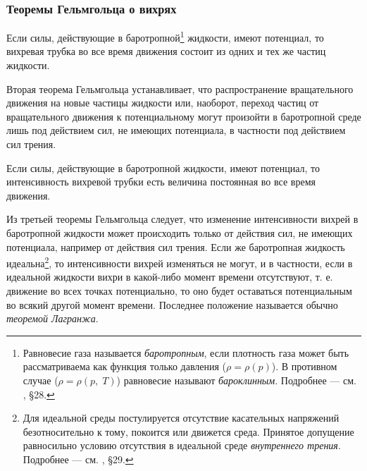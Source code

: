 	\subsubsection{Теоремы Гельмгольца о вихрях}
	\begin{theorem}\label{thm:Gelmgolts-2}
		Если силы, действующие в баротропной\footnote{Равновесие газа называется \textit{баротропным}, если плотность газа может быть рассматриваема как функция только давления ($\rho=\rho\left(p\right)$). В противном случае ($\rho=\rho\left(p,\; T\right)$) равновесие называют \textit{бароклинным}. Подробнее --- см. \cite{5}, \S28.} жидкости, имеют потенциал, то вихревая трубка во все время движения состоит из одних и тех же частиц жидкости.
	\end{theorem}
	Вторая теорема Гельмгольца устанавливает, что распространение вращательного движения на новые частицы жидкости или, наоборот, переход частиц от вращательного движения к потенциальному могут произойти в баротропной среде лишь под действием сил, не имеющих потенциала, в частности под действием сил трения.
	\begin{theorem}\label{thm:Gelmgolts-3}
		Если силы, действующие в баротропной жидкости, имеют потенциал, то интенсивность вихревой трубки есть величина постоянная во все время движения.
	\end{theorem}
	Из третьей теоремы Гельмгольца следует, что изменение интенсивности вихрей в баротропной жидкости может происходить только от действия сил, не имеющих потенциала, например от действия сил трения.\n
	Если же баротропная жидкость идеальна\footnote{Для идеальной среды постулируется отсутствие касательных напряжений безотносительно к тому, покоится или движется среда. Принятое допущение равносильно условию отсутствия в идеальной среде \textit{внутреннего трения}. Подробнее --- см. \cite{5}, \S29.}, то интенсивности вихрей изменяться не могут, и в частности, если в идеальной жидкости вихри в какой-либо момент времени отсутствуют, т. е. движение во всех точках потенциально, то оно будет оставаться потенциальным во всякий другой момент времени. Последнее положение называется обычно \textit{теоремой Лагранжа}.
